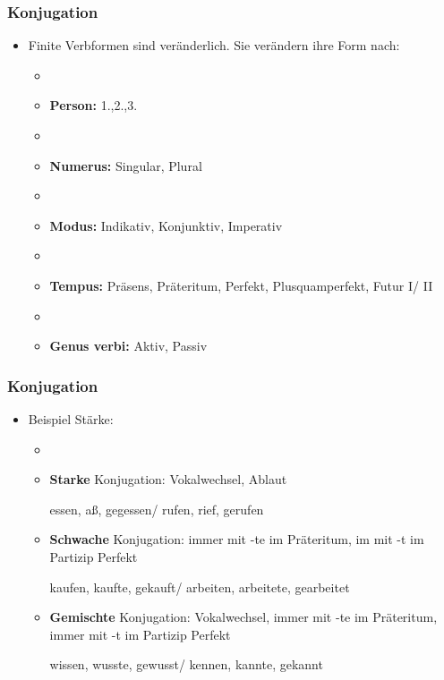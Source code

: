 
\begin{frame}
\frametitle{Konjugation}

\begin{itemize}
\item Finite Verbformen sind veränderlich. Sie verändern ihre Form nach: 

\begin{itemize}
\item[]
\item \textbf{Person:} 1.,2.,3.
\item[]
\item \textbf{Numerus:} Singular, Plural
\item[]
\item \textbf{Modus:} Indikativ, Konjunktiv, Imperativ
\item[]
\item \textbf{Tempus:} Präsens, Präteritum, Perfekt, Plusquamperfekt, Futur I/ II
\item[]
\item \textbf{Genus verbi:} Aktiv, Passiv
\end{itemize}

\end{itemize}


\end{frame}




\begin{frame}
\frametitle{Konjugation}

\begin{itemize}
\item Beispiel Stärke:

\begin{itemize}
\item[]
\item \textbf{Starke} Konjugation: Vokalwechsel, Ablaut

\ea essen, aß, gegessen/ rufen, rief, gerufen
\z

\item \textbf{Schwache} Konjugation: immer mit -te im Präteritum, im mit -t im Partizip Perfekt

\ea kaufen, kaufte, gekauft/ arbeiten, arbeitete, gearbeitet
\z

\item \textbf{Gemischte} Konjugation: Vokalwechsel, immer mit -te im Präteritum, immer mit -t im Partizip Perfekt

\ea wissen, wusste, gewusst/ kennen, kannte, gekannt
\z

\end{itemize}

\end{itemize}


\end{frame}



